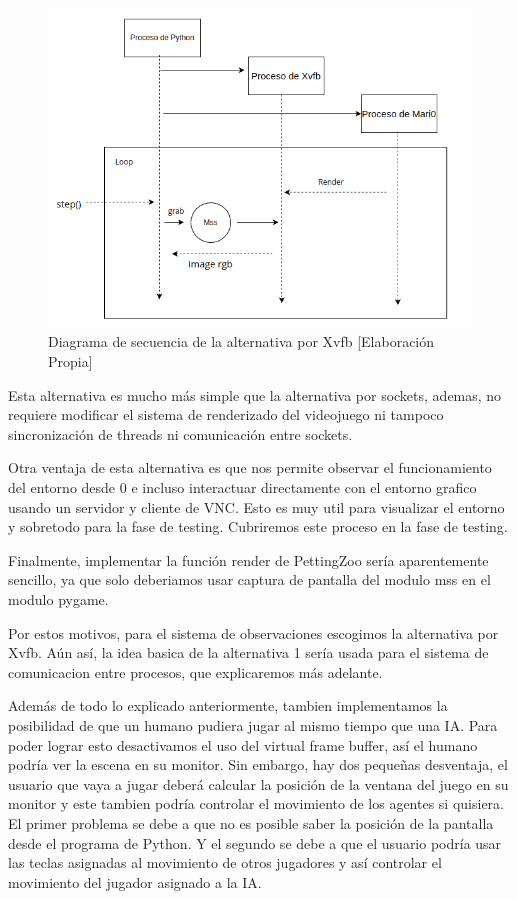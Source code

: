 \begin{figure}[ht]
    \centering
    \includegraphics[width=1.0\textwidth]{img/obsevation_sequence.png}
    \caption{Diagrama de secuencia de la alternativa por Xvfb [Elaboración Propia]}
    \label{fig:alternativa-2-seq}
\end{figure}

Esta alternativa es mucho más simple que la alternativa por sockets, ademas, no requiere modificar el sistema de renderizado del videojuego ni tampoco sincronización de threads ni comunicación entre sockets. 

Otra ventaja de esta alternativa es que nos permite observar el funcionamiento del entorno desde 0 e incluso interactuar directamente con el entorno grafico usando un servidor y cliente de VNC. Esto es muy util para visualizar el entorno y sobretodo para la fase de testing. Cubriremos este proceso en la fase de testing.

Finalmente, implementar la función render de PettingZoo sería aparentemente sencillo, ya que solo deberiamos usar captura de pantalla del modulo mss en el modulo pygame.

Por estos motivos, para el sistema de observaciones escogimos la alternativa por Xvfb. Aún así, la idea basica de la alternativa 1 sería usada para el sistema de comunicacion entre procesos, que explicaremos más adelante. 

Además de todo lo explicado anteriormente, tambien implementamos la posibilidad de que un humano pudiera jugar al mismo tiempo que una IA. Para poder lograr esto desactivamos el uso del virtual frame buffer, así el humano podría ver la escena en su monitor. Sin embargo, hay dos pequeñas desventaja, el usuario que vaya a jugar deberá calcular la posición de la ventana del juego en su monitor y este tambien podría controlar el movimiento de los agentes si quisiera. El primer problema se debe a que no es posible saber la posición de la pantalla desde el programa de Python. Y el segundo se debe a que el usuario podría usar las teclas asignadas al movimiento de otros jugadores y así controlar el movimiento del jugador asignado a la IA.


